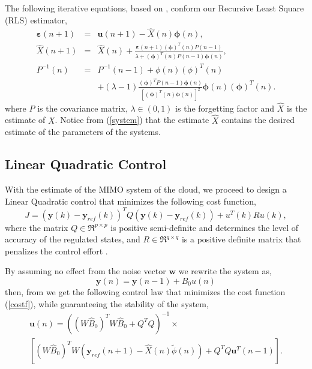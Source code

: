\documentclass{acm_proc_article-sp}
\begin{document}
The following iterative equations, based on \cite{Kulhavy-1987}, conform our Recursive Least Square (RLS)
estimator,
\begin{eqnarray}
 \mathbf{\varepsilon}(n+1) & = & \mathbf{u}(n+1) - \hat{X}(n)\mathbf{\phi}(n), \nonumber \\
\hat{X}(n+1) & = & \hat{X}(n)+\frac{\mathbf{\varepsilon}(n+1)(\mathbf{\phi})^{T}(n)P(n-1)}{\lambda + (\mathbf{\phi})^{T}(n)P(n-1)\mathbf{\phi}(n)}, \nonumber \\
P^{-1}(n) & = & P^{-1}(n-1) + \phi(n)(\phi)^{T}(n) \nonumber \\
& & + (\lambda - 1) \frac{(\mathbf{\phi})^{T}P(n-1)\mathbf{\phi}(n)}{[(\mathbf{\phi})^{T}(n)\mathbf{\phi}(n)]^{2}} \mathbf{\phi}(n)(\mathbf{\phi})^{T}(n) \nonumber.
\end{eqnarray}
where $P$ is the covariance matrix, $\lambda \in (0,1)$ is the forgetting factor and $\hat{X}$ is the estimate of $X$.
Notice from (\ref{system}) that the estimate $\hat{X}$ contains the desired estimate of the parameters of the systems.

\subsection{Linear Quadratic Control}
With the estimate of the MIMO system of the cloud, we proceed to design a Linear Quadratic control that minimizes the 
following cost function,
\begin{equation}
 J = (\mathbf{y}(k)-\mathbf{y}_{ref}(k))^{T}Q(\mathbf{y}(k)-\mathbf{y}_{ref}(k)) + u^{T}(k)Ru(k), \label{costf}
\end{equation}
where the matrix $Q \in \Re^{p \times p}$ is positive semi-definite and determines the level of accuracy of the regulated 
states, and $R \in \Re^{q \times q}$ is a positive definite matrix that penalizes the control effort \cite{Dorato-2000}.

By assuming no effect from the noise vector $\mathbf{w}$ we rewrite the system as,
\begin{displaymath}
 \mathbf{y}(n) = \mathbf{y}(n-1) + B_{0}u(n)
\end{displaymath}
then, from \cite{Liu-2007} we get the following control law that minimizes the cost function (\ref{costf}), while guaranteeing the stability
of the system,
\begin{eqnarray}
 &\mathbf{u}(n) = \left( (W\hat{B}_{0})^{T}W\hat{B}_{0}+Q^{T}Q \right)^{-1} \times& \nonumber \\ 
 &\left[ (W\hat{B}_{0})^{T}W \left(\mathbf{y}_{ref}(n+1) -\hat{X}(n)\tilde{\phi}(n) \right) + Q^{T}Q \mathbf{u}^{T}(n-1) \right].& \nonumber
\end{eqnarray}
\end{document}
